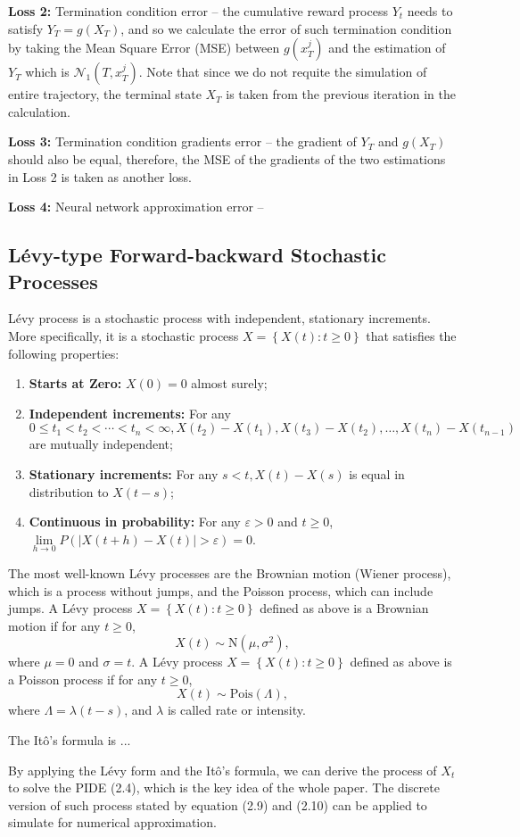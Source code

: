 \documentclass[12pt,letterpaper,oneside]{article}
\begin{document}
	\textbf{Loss 2: } Termination condition error -- the cumulative reward process $ Y_t $ needs to satisfy $ Y_T = g(X_T) $, and so we calculate the error of such termination condition by taking the Mean Square Error (MSE) between $ g(x_T^j) $ and the estimation of $ Y_T $ which is $ \mathcal{N}_1(T,x_T^j) $. Note that since we do not requite the simulation of entire trajectory, the terminal state $ X_T $ is taken from the previous iteration in the calculation. 
	
	\textbf{Loss 3: } Termination condition gradients error -- the gradient of $ Y_T $ and $ g(X_T) $ should also be equal, therefore, the MSE of the gradients of the two estimations in Loss 2 is taken as another loss.
	
	\textbf{Loss 4: } Neural network approximation error -- 
	
	
\subsection{L\'evy-type Forward-backward Stochastic Processes}
	L\'evy process is a stochastic process with independent, stationary increments. More specifically, it is a stochastic process $X=\left\{X(t): t \geq 0\right\}$ that satisfies the following properties:
	\begin{enumerate}
		\item \textbf{Starts at Zero: }$X(0)=0$ almost surely;
		\item \textbf{Independent increments: }For any $0 \leq t_1<t_2<\cdots<t_n<\infty, X(t_2)-X(t_1), X(t_3)-X(t_2), \ldots, X(t_n)-X(t_{n-1})$ are mutually independent;
		\item \textbf{Stationary increments: }For any $s<t, X(t)-X(s)$ is equal in distribution to $X(t-s)$;
		\item \textbf{Continuous in probability: }For any $\varepsilon>0$ and $t \geq 0$, $\lim \limits_{h \rightarrow 0} P\left(\left|X(t+h)-X(t)\right|>\varepsilon\right)=0$.
	\end{enumerate}
	 The most well-known L\'evy processes are the Brownian motion (Wiener process), which is a process without jumps, and the Poisson process, which can include jumps. A L\'evy process $X=\left\{X(t): t \geq 0\right\}$ defined as above is a Brownian motion if for any $t\ge 0$,
	 $$ X(t) \sim \text{N}(\mu, \sigma^2), $$
	 where $ \mu = 0 $ and $ \sigma = t $.
	 A L\'evy process $X=\left\{X(t): t \geq 0\right\}$ defined as above is a Poisson process if for any $t\ge 0$,
	 $$ X(t) \sim \text{Pois}(\Lambda), $$ 
	 where $ \Lambda = \lambda(t-s) $, and $ \lambda $ is called rate or intensity.
	 
	 The It\^o's formula is ...
	 
	 By applying the L\'evy form and the It\^o's formula, we can derive the process of $ X_t $ to solve the PIDE (2.4), which is the key idea of the whole paper. The discrete version of such process stated by equation (2.9) and (2.10) can be applied to simulate for numerical approximation.
\end{document}
